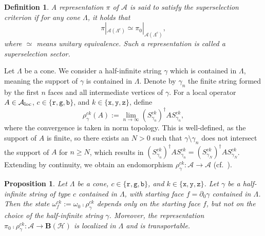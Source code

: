 \documentclass[a4paper,11pt]{article}
\newtheorem{proposition}[theorem]{Proposition}
\newtheorem{definition}[theorem]{Definition}
\theoremstyle{definition}
\theoremstyle{remark}
\theoremstyle{remark}
\begin{document}
\begin{definition}
    A representation $\pi$ of $\mathcal{A}$ is said to satisfy the superselection criterion if for any cone $\Lambda$, it holds that 
    \begin{equation*}
        \pi|_{\mathcal{A}(\Lambda^c)} \simeq \pi_0|_{\mathcal{A}(\Lambda^c)},
    \end{equation*}
    where $\simeq$ means unitary equivalence. Such a representation is called a superselection sector. 
\end{definition}


Let $\Lambda$ be a cone. We consider a half-infinite string $\gamma$ which is contained in $\Lambda$, meaning the support of $\gamma$ is contained in $\Lambda$. Denote by $\gamma_n$ the finite string formed by the first $n$ faces and all intermediate vertices of $\gamma$. For a local operator $A\in \mathcal{A}_{\rm loc}$, $c\in \{\mathtt{r},\mathtt{g},\mathtt{b}\}$, and $k\in \{\mathtt{x},\mathtt{y},\mathtt{z}\}$, define 
\begin{equation*}
    \rho_\gamma^{ck}(A) := \lim_{n\to\infty} (S_{\gamma_n}^{ck})^\dagger A S_{\gamma_n}^{ck},
\end{equation*}
where the convergence is taken in norm topology. 
This is well-defined, as the support of $A$ is finite, so there exists an $N>0$ such that $\gamma\setminus \gamma_n$ does not intersect the support of $A$ for $n\geq N$, which results in $(S_{\gamma_n}^{ck})^\dagger A S_{\gamma_n}^{ck} = (S_{\gamma_N}^{ck})^\dagger A S_{\gamma_N}^{ck}$. 
Extending by continuity, we obtain an endomorphism $\rho_\gamma^{ck}:\mathcal{A}\to \mathcal{A}$ (cf.~\cite{naaijkens2011localized}).  

\begin{proposition} \label{prop:local-transp}
    Let $\Lambda$ be a cone, $c\in \{\mathtt{r},\mathtt{g},\mathtt{b}\}$, and $k\in \{\mathtt{x},\mathtt{y},\mathtt{z}\}$. Let $\gamma$ be a half-infinite string of type $c$ contained in $\Lambda$, with starting face $f=\partial_0\gamma$ contained in $\Lambda$. Then the state $\omega_f^{ck}:=\omega_0\comp\rho_\gamma^{ck}$ depends only on the starting face $f$, but not on the choice of the half-infinite string $\gamma$. Moreover, the representation $\pi_0\comp\rho_\gamma^{ck}:\mathcal{A}\to\mathbf{B}(\mathcal{H})$ is localized in $\Lambda$ and is transportable.
\end{proposition}
\end{document}
